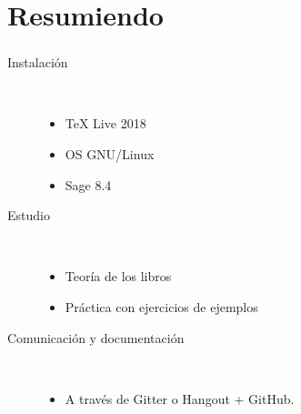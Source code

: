 %
%
%
%

%

%


\section{Resumiendo}
\begin{frame}[c]\frametitle{\insertsection}
\begin{description}
	\item[Instalación] \hfill\\
	\begin{itemize}
		\item \TeX{} Live 2018
		\item OS GNU/Linux
		\item Sage 8.4
	\end{itemize}
	\item[Estudio]\hfill\\
	\begin{itemize}
		\item Teoría de los libros
		\item Práctica con ejercicios de ejemplos
	\end{itemize}
	\item[Comunicación y documentación]\hfill\\
	\begin{itemize}
		\item A través de Gitter o Hangout + GitHub.
	\end{itemize}
\end{description}


\end{frame}